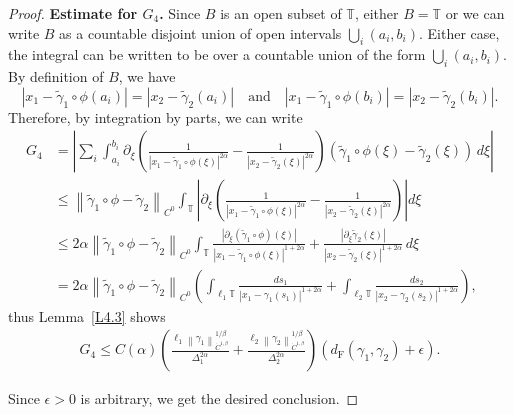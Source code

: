 \documentclass[reqno,centertags,12pt]{amsart}
\theoremstyle{definition}
\numberwithin{equation}{section}
\newcommand{\abs}[1]{\left\lvert#1\right\rvert}
\newcommand{\norm}[1]{\left\|#1\right\|}
\newcommand{\bbT}{{\mathbb{T}}}
\begin{document}
\begin{proof}
    \textbf{Estimate for $G_{4}$.} Since $B$ is an open subset of $\bbT$,
    either $B=\bbT$ or we can write $B$ as a countable disjoint union of open intervals
    $\bigcup_{i}(a_{i},b_{i})$. Either case, the integral can be written to be over
    a countable union of the form $\bigcup_{i}(a_{i},b_{i})$. By definition of $B$, we have
    \[
        \abs{x_{1} - \tilde{\gamma}_{1}\circ\phi(a_{i})}
        = \abs{x_{2} - \tilde{\gamma}_{2}(a_{i})}
        \quad\textrm{and}\quad
        \abs{x_{1} - \tilde{\gamma}_{1}\circ\phi(b_{i})}
        = \abs{x_{2} - \tilde{\gamma}_{2}(b_{i})}.
    \]
    Therefore, by integration by parts, we can write
    \begin{align*}
        G_{4} &= \abs{
            \sum_{i}\int_{a_{i}}^{b_{i}}
            \partial_{\xi}\left(
                \frac{1}{\abs{x_{1} - \tilde{\gamma}_{1}\circ\phi(\xi)}^{2\alpha}}
            - \frac{1}{\abs{x_{2} - \tilde{\gamma}_{2}(\xi)}^{2\alpha}}
            \right)
            (\tilde{\gamma}_{1}\circ\phi(\xi) - \tilde{\gamma}_{2}(\xi))\,d\xi
        } \\
        &\leq \norm{\tilde{\gamma}_{1}\circ\phi - \tilde{\gamma}_{2}}_{C^{0}}
        \int_{\bbT}\abs{\partial_{\xi}\left(
            \frac{1}{\abs{x_{1} - \tilde{\gamma}_{1}\circ\phi(\xi)}^{2\alpha}}
        - \frac{1}{\abs{x_{2} - \tilde{\gamma}_{2}(\xi)}^{2\alpha}}
        \right)}d\xi \\
        &\leq 2\alpha\norm{\tilde{\gamma}_{1}\circ\phi - \tilde{\gamma}_{2}}_{C^{0}}
        \int_{\bbT}\frac{\abs{\partial_{\xi}(\tilde{\gamma}_{1}\circ\phi)(\xi)}}
        {\abs{x_{1} - \tilde{\gamma}_{1}\circ\phi(\xi)}^{1+2\alpha}}
        + \frac{\abs{\partial_{\xi}\tilde{\gamma}_{2}(\xi)}}
        {\abs{x_{2} - \tilde{\gamma}_{2}(\xi)}^{1+2\alpha}}\,d\xi \\
        &= 2\alpha\norm{\tilde{\gamma}_{1}\circ\phi - \tilde{\gamma}_{2}}_{C^{0}}
        \left(
            \int_{\ell_{1}\bbT}\frac{ds_{1}}{\abs{x_{1} - \gamma_{1}(s_{1})}^{1+2\alpha}}
            + \int_{\ell_{2}\bbT}\frac{ds_{2}}{\abs{x_{2} - \gamma_{2}(s_{2})}^{1+2\alpha}}
        \right),
    \end{align*}
    thus Lemma~\ref{L4.3} shows
    \begin{align*}
        G_{4} \leq C(\alpha)\left(
            \frac{\ell_{1}\norm{\gamma_{1}}_{\dot{C}^{1,\beta}}^{1/\beta}}
            {\Delta_{1}^{2\alpha}}
            + \frac{\ell_{2}\norm{\gamma_{2}}_{\dot{C}^{1,\beta}}^{1/\beta}}
            {\Delta_{2}^{2\alpha}}
        \right)
        \left(d_{\mathrm{F}}(\gamma_{1},\gamma_{2}) + \epsilon\right).
    \end{align*}

    Since $\epsilon>0$ is arbitrary, we get the desired conclusion.
\end{proof}
\end{document}
